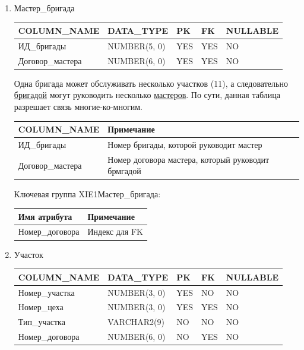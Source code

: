 \begin{enumerate}
\begin{tabular}{|p{4cm}|p{5cm}|}
    \end{tabular}

    \item Мастер\_бригада

    \begin{tabular}{|p{4cm}|p{3cm}|p{1cm}|p{1cm}|p{2cm}|} \hline

        {\bf COLUMN\_NAME} & {\bf DATA\_TYPE} & {\bf PK} & {\bf FK} & {\bf NULLABLE} \\ \hline
        ИД\_бригады & NUMBER(5, 0) & YES & YES & NO \\ \hline
        Договор\_мастера & NUMBER(6, 0) & YES & YES & NO \\ \hline

    \end{tabular}

    Одна бригада может обслуживать несколько участков (11), а следовательно \underline{бригадой} могут руководить несколько \underline{мастеров}.
    По сути, данная таблица разрешает связь многие-ко-многим.

    \begin{tabular}{|p{4cm}|p{5cm}|} \hline

        {\bf COLUMN\_NAME} & {\bf Примечание} \\ \hline
        ИД\_бригады & Номер бригады, которой руководит мастер \\ \hline
        Договор\_мастера & Номер договора мастера, который руководит брмгадой \\ \hline

    \end{tabular}

    Ключевая группа XIE1Мастер\_бригада:

    \begin{tabular}{|p{4cm}|p{5cm}|} \hline

        {\bf Имя атрибута} & {\bf Примечание} \\ \hline
        Номер\_договора & Индекс для FK \\ \hline

    \end{tabular}

    \item{Участок}

    \begin{tabular}{|p{4cm}|p{3cm}|p{1cm}|p{1cm}|p{2cm}|} \hline

        {\bf COLUMN\_NAME} & {\bf DATA\_TYPE} & {\bf PK} & {\bf FK} & {\bf NULLABLE} \\ \hline
        Номер\_участка & NUMBER(3, 0) & YES & NO & NO \\ \hline
        Номер\_цеха & NUMBER(3, 0) & YES & YES & NO \\ \hline
        Тип\_участка & VARCHAR2(9) & NO & NO & NO \\ \hline
        Номер\_договора & NUMBER(6, 0) & NO & YES & NO \\ \hline


\end{tabular}
\end{enumerate}
